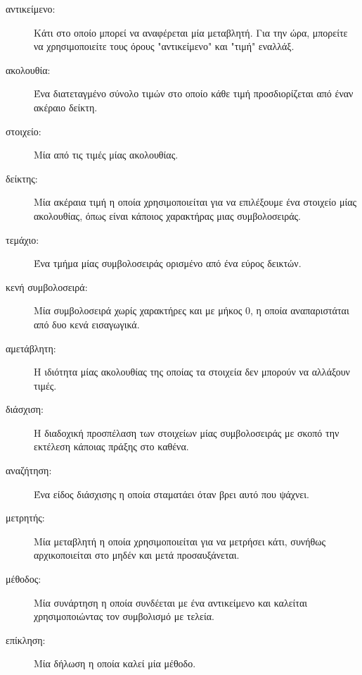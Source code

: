\documentclass[10pt]{book}
\begin{document}
\begin{description}

\item[αντικείμενο:] Κάτι στο οποίο μπορεί να αναφέρεται μία μεταβλητή. Για την ώρα, μπορείτε να χρησιμοποιείτε τους όρους "αντικείμενο" και "τιμή" εναλλάξ.

\item[ακολουθία:] Ένα διατεταγμένο σύνολο τιμών στο οποίο κάθε τιμή προσδιορίζεται από έναν ακέραιο δείκτη.

\item[στοιχείο:] Μία από τις τιμές μίας ακολουθίας.

\item[δείκτης:] Μία ακέραια τιμή η οποία χρησιμοποιείται για να επιλέξουμε ένα στοιχείο μίας ακολουθίας, όπως είναι κάποιος χαρακτήρας μιας συμβολοσειράς.

\item[τεμάχιο:] Ένα τμήμα μίας συμβολοσειράς ορισμένο από ένα εύρος δεικτών.

\item[κενή συμβολοσειρά:] Μία συμβολοσειρά χωρίς χαρακτήρες και με μήκος 0, η οποία αναπαριστάται από δυο κενά εισαγωγικά.

\item[αμετάβλητη:] Η ιδιότητα μίας ακολουθίας της οποίας τα στοιχεία δεν μπορούν να αλλάξουν τιμές.

\item[διάσχιση:] Η διαδοχική προσπέλαση των στοιχείων μίας συμβολοσειράς με σκοπό την εκτέλεση κάποιας πράξης στο καθένα.

\item[αναζήτηση:] Ένα είδος διάσχισης η οποία σταματάει όταν βρει αυτό που ψάχνει.

\item[μετρητής:] Μία μεταβλητή η οποία χρησιμοποιείται για να μετρήσει κάτι, συνήθως αρχικοποιείται στο μηδέν και μετά προσαυξάνεται.

\item[μέθοδος:] Μία συνάρτηση η οποία συνδέεται με ένα αντικείμενο και καλείται χρησιμοποιώντας τον συμβολισμό με τελεία.

\item[επίκληση:] Μία δήλωση η οποία καλεί μία μέθοδο.

\end{description}
\end{document}
